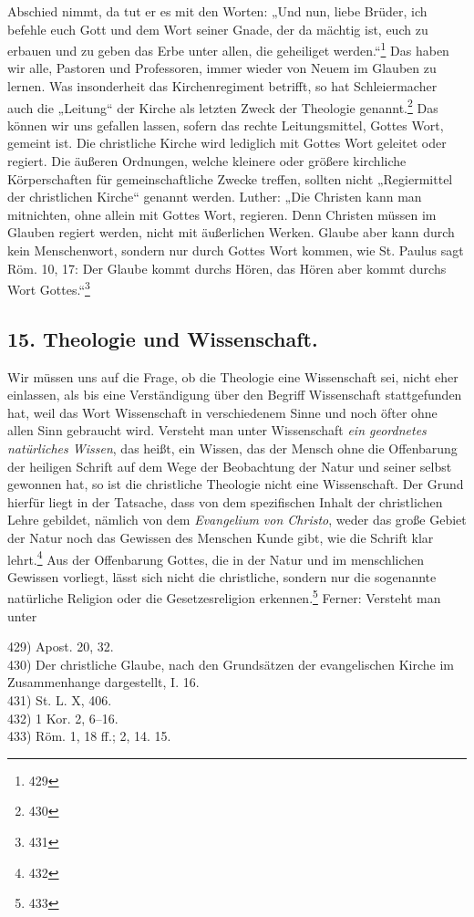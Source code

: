 Abschied nimmt, da tut er es mit den Worten: „Und nun, liebe Brüder, ich befehle euch Gott und dem Wort seiner Gnade, der da mächtig ist, euch zu erbauen und zu geben das Erbe unter allen, die geheiliget werden.“\footnote{429} Das haben wir alle, Pastoren und Professoren, immer wieder von Neuem im Glauben zu lernen. Was insonderheit das Kirchenregiment betrifft, so hat Schleiermacher auch die „Leitung“ der Kirche als letzten Zweck der Theologie genannt.\footnote{430} Das können wir uns gefallen lassen, sofern das rechte Leitungsmittel, Gottes Wort, gemeint ist. Die christliche Kirche wird lediglich mit Gottes Wort geleitet oder regiert. Die äußeren Ordnungen, welche kleinere oder größere kirchliche Körperschaften für gemeinschaftliche Zwecke treffen, sollten nicht „Regiermittel der christlichen Kirche“ genannt werden. Luther: „Die Christen kann man mitnichten, ohne allein mit Gottes Wort, regieren. Denn Christen müssen im Glauben regiert werden, nicht mit äußerlichen Werken. Glaube aber kann durch kein Menschenwort, sondern nur durch Gottes Wort kommen, wie St. Paulus sagt Röm. 10, 17: Der Glaube kommt durchs Hören, das Hören aber kommt durchs Wort Gottes.“\footnote{431}

\subsection*{15. Theologie und Wissenschaft.}

Wir müssen uns auf die Frage, ob die Theologie eine Wissenschaft sei, nicht eher einlassen, als bis eine Verständigung über den Begriff Wissenschaft stattgefunden hat, weil das Wort Wissenschaft in verschiedenem Sinne und noch öfter ohne allen Sinn gebraucht wird. Versteht man unter Wissenschaft \emph{ein geordnetes natürliches Wissen}, das heißt, ein Wissen, das der Mensch ohne die Offenbarung der heiligen Schrift auf dem Wege der Beobachtung der Natur und seiner selbst gewonnen hat, so ist die christliche Theologie nicht eine Wissenschaft. Der Grund hierfür liegt in der Tatsache, dass von dem spezifischen Inhalt der christlichen Lehre gebildet, nämlich von dem \emph{Evangelium von Christo}, weder das große Gebiet der Natur noch das Gewissen des Menschen Kunde gibt, wie die Schrift klar lehrt.\footnote{432} Aus der Offenbarung Gottes, die in der Natur und im menschlichen Gewissen vorliegt, lässt sich nicht die christliche, sondern nur die sogenannte natürliche Religion oder die Gesetzesreligion erkennen.\footnote{433} Ferner: Versteht man unter

\par\vspace{1em}
\begin{small}
429) Apost. 20, 32.\\
430) Der christliche Glaube, nach den Grundsätzen der evangelischen Kirche im Zusammenhange dargestellt, I. 16.\\
431) St. L. X, 406.\\
432) 1 Kor. 2, 6--16.\\
433) Röm. 1, 18 ff.; 2, 14. 15.
\end{small}